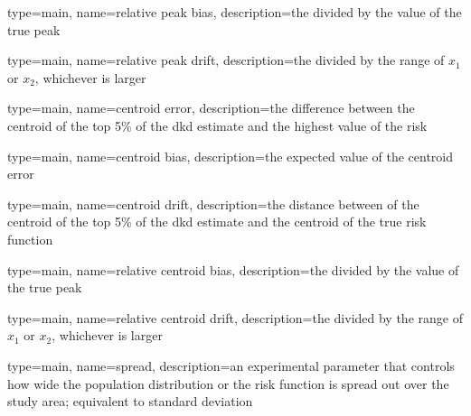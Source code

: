 {%
   type=main,
   name={relative peak bias},
   description={the  divided by the value of the true peak}
}

{%
   type=main,
   name={relative peak drift},
   description={the  divided by the range of \ensuremath{x_1} or \ensuremath{x_2}, whichever is larger}
}

{%
   type=main,
   name={centroid error},
   description={the difference between the centroid of the top 5\% of the dkd estimate and the highest value of the risk}
}

{%
   type=main,
   name={centroid bias},
   description={the expected value of the centroid error}
}

{%
   type=main,
   name={centroid drift},
   description={the distance between of the centroid of the top 5\% of the dkd estimate and the centroid of the true risk function}
}

{%
   type=main,
   name={relative centroid bias},
   description={the  divided by the value of the true peak}
}

{%
   type=main,
   name={relative centroid drift},
   description={the  divided by the range of \ensuremath{x_1} or \ensuremath{x_2}, whichever is larger}
}

{
   type=main,
   name={spread},
   description={an experimental parameter that controls how wide the population distribution or the risk function is spread out over the study area; equivalent to standard deviation}
}


